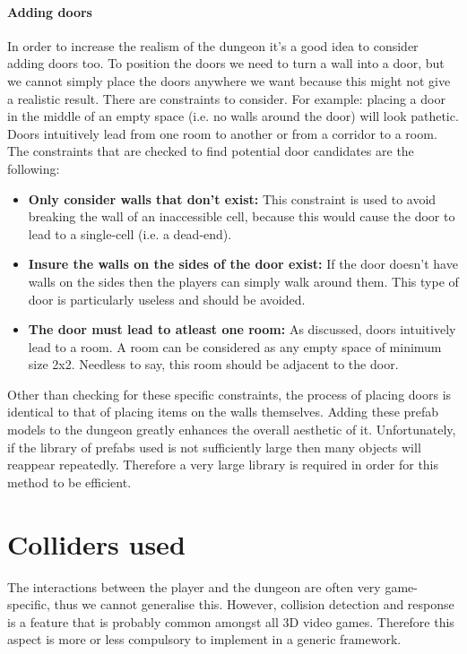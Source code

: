 \paragraph{Adding doors}
In order to increase the realism of the dungeon it's a good idea to consider adding doors too. To position the doors we need to turn a wall into a door, but we cannot simply place the doors anywhere we want because this might not give a realistic result. There are constraints to consider. For example: placing a door in the middle of an empty space (i.e. no walls around the door) will look pathetic. Doors intuitively lead from one room to another or from a corridor to a room. The constraints that are checked to find potential door candidates are the following:
\begin{itemize}
\item {\bf Only consider walls that don't exist:} This constraint is used to avoid breaking the wall of an inaccessible cell, because this would cause the door to lead to a single-cell (i.e. a dead-end).
\item {\bf Insure the walls on the sides of the door exist:} If the door doesn't have walls on the sides then the players can simply walk around them. This type of door is particularly useless and should be avoided.
\item {\bf The door must lead to atleast one room:} As discussed, doors intuitively lead to a room. A room can be considered as any empty space of minimum size 2x2. Needless to say, this room should be adjacent to the door.
\end{itemize}

Other than checking for these specific constraints, the process of placing doors is identical to that of placing items on the walls themselves. Adding these prefab models to the dungeon greatly enhances the overall aesthetic of it. Unfortunately, if the library of prefabs used is not sufficiently large then many objects will reappear repeatedly. Therefore a very large library is required in order for this method to be efficient.








\section{Colliders used}
The interactions between the player and the dungeon are often very game-specific, thus we cannot generalise this. However, collision detection and response is a feature that is probably common amongst all 3D video games. Therefore this aspect is more or less compulsory to implement in a generic framework.

